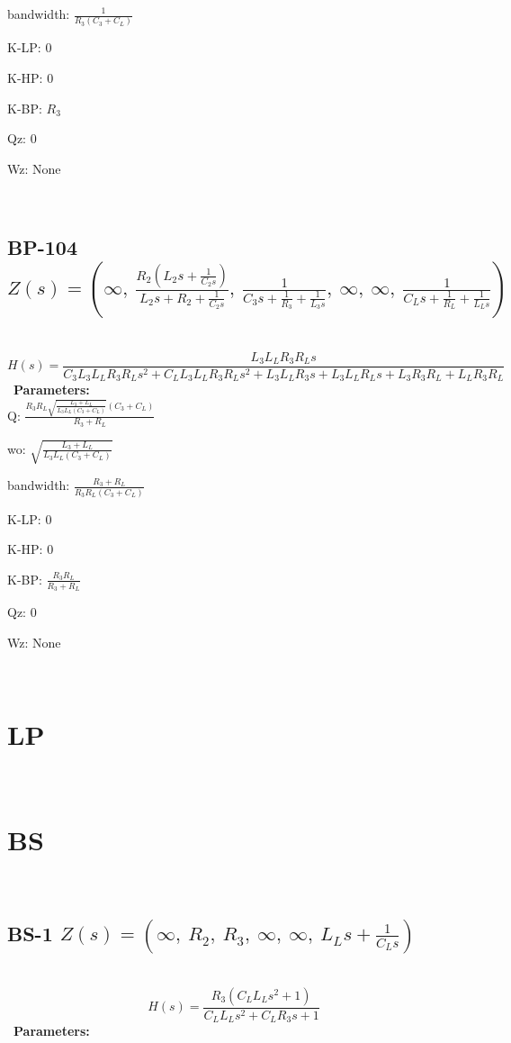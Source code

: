 \documentclass{article}
\begin{document}
bandwidth: $\frac{1}{R_{3} \left(C_{3} + C_{L}\right)}$\ 

K-LP: $0$\ 

K-HP: $0$\ 

K-BP: $R_{3}$\ 

Qz: $0$\ 

Wz: $\text{None}$\ 

\ 

\subsection{BP-104 $Z(s) = \left( \infty, \  \frac{R_{2} \left(L_{2} s + \frac{1}{C_{2} s}\right)}{L_{2} s + R_{2} + \frac{1}{C_{2} s}}, \  \frac{1}{C_{3} s + \frac{1}{R_{3}} + \frac{1}{L_{3} s}}, \  \infty, \  \infty, \  \frac{1}{C_{L} s + \frac{1}{R_{L}} + \frac{1}{L_{L} s}}\right)$ } \ 
\textbf{\[H(s) = \frac{L_{3} L_{L} R_{3} R_{L} s}{C_{3} L_{3} L_{L} R_{3} R_{L} s^{2} + C_{L} L_{3} L_{L} R_{3} R_{L} s^{2} + L_{3} L_{L} R_{3} s + L_{3} L_{L} R_{L} s + L_{3} R_{3} R_{L} + L_{L} R_{3} R_{L}}\] } \ 
\textbf{Parameters:}\\ 

Q: $\frac{R_{3} R_{L} \sqrt{\frac{L_{3} + L_{L}}{L_{3} L_{L} \left(C_{3} + C_{L}\right)}} \left(C_{3} + C_{L}\right)}{R_{3} + R_{L}}$\ 

wo: $\sqrt{\frac{L_{3} + L_{L}}{L_{3} L_{L} \left(C_{3} + C_{L}\right)}}$\ 

bandwidth: $\frac{R_{3} + R_{L}}{R_{3} R_{L} \left(C_{3} + C_{L}\right)}$\ 

K-LP: $0$\ 

K-HP: $0$\ 

K-BP: $\frac{R_{3} R_{L}}{R_{3} + R_{L}}$\ 

Qz: $0$\ 

Wz: $\text{None}$\ 

\ 

\section{LP}\ 
\section{BS}\ 
\subsection{BS-1 $Z(s) = \left( \infty, \  R_{2}, \  R_{3}, \  \infty, \  \infty, \  L_{L} s + \frac{1}{C_{L} s}\right)$ } \ 
\textbf{\[H(s) = \frac{R_{3} \left(C_{L} L_{L} s^{2} + 1\right)}{C_{L} L_{L} s^{2} + C_{L} R_{3} s + 1}\] } \ 
\textbf{Parameters:}\\ 
\end{document}

